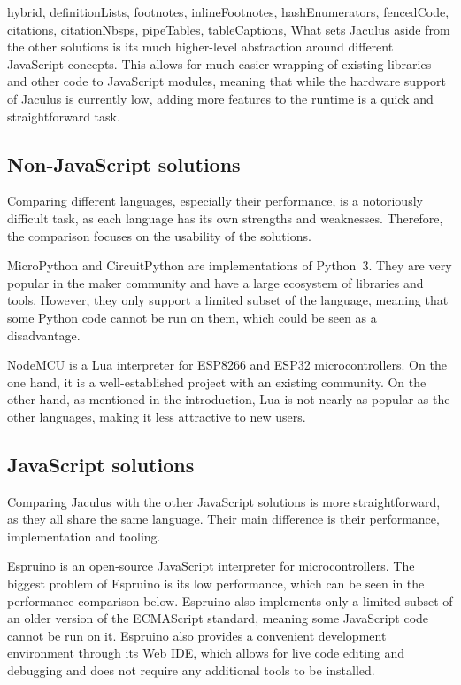 \begin{markdown*}{%
  hybrid,
  definitionLists,
  footnotes,
  inlineFootnotes,
  hashEnumerators,
  fencedCode,
  citations,
  citationNbsps,
  pipeTables,
  tableCaptions,
}
What sets Jaculus aside from the other solutions is its much higher-level abstraction around different JavaScript concepts. This allows for much easier wrapping of existing libraries and other code to JavaScript modules, meaning that while the hardware support of Jaculus is currently low, adding more features to the runtime is a quick and straightforward task.

\subsection{Non-JavaScript solutions}

Comparing different languages, especially their performance, is a notoriously difficult task, as each language has its own strengths and weaknesses. Therefore, the comparison focuses on the usability of the solutions.

MicroPython and CircuitPython are implementations of Python~3. They are very popular in the maker community and have a large ecosystem of libraries and tools. However, they only support a limited subset of the language, meaning that some Python code cannot be run on them, which could be seen as a disadvantage.

NodeMCU is a Lua interpreter for ESP8266 and ESP32 microcontrollers. On the one hand, it is a well-established project with an existing community. On the other hand, as mentioned in the introduction, Lua is not nearly as popular as the other languages, making it less attractive to new users.

\subsection{JavaScript solutions}

Comparing Jaculus with the other JavaScript solutions is more straightforward, as they all share the same language. Their main difference is their performance, implementation and tooling.

Espruino is an open-source JavaScript interpreter for microcontrollers. The biggest problem of Espruino is its low performance, which can be seen in the performance comparison below. Espruino also implements only a limited subset of an older version of the ECMAScript standard, meaning some JavaScript code cannot be run on it. Espruino also provides a convenient development environment through its Web IDE, which allows for live code editing and debugging and does not require any additional tools to be installed.


\end{markdown*}

